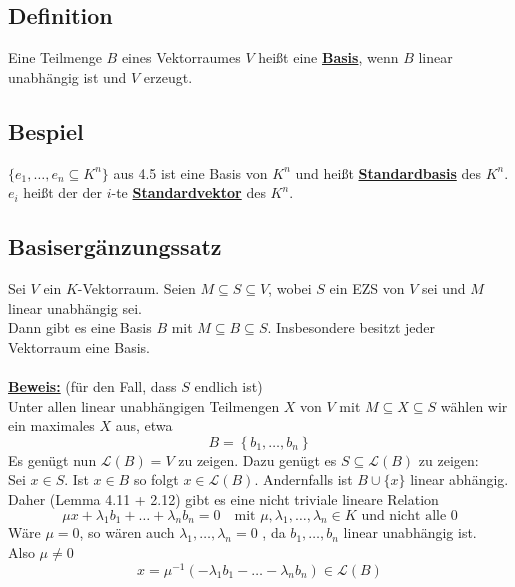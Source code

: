 \subsection{Definition} %
\label{sub:definition}
Eine Teilmenge $B$ eines Vektorraumes $V$ heißt eine \underline{\textbf{Basis}}, wenn $B$ linear unabhängig ist und $V$ erzeugt.

\subsection{Bespiel} %
\label{sub:bespiel}
$\{ e_1, \ldots , e_n \subseteq K^n\}$ aus 4.5 ist eine Basis von $K^n$ und heißt \underline{\textbf{Standardbasis}} des $K^n$. $e_i$ heißt der der $i$-te \underline{\textbf{Standardvektor}} des $K^n$.

\subsection{Basisergänzungssatz} %
\label{sub:basisergänzungssatz}
Sei $V$ ein $K$-Vektorraum. Seien $M \subseteq S \subseteq V$, wobei $S$ ein EZS von $V$ sei und $M$ linear unabhängig sei. \\
Dann gibt es eine Basis $B$ mit $M \subseteq B \subseteq S$. Insbesondere besitzt jeder Vektorraum eine Basis. \\
\vspace{\baselineskip} \\
\underline{\textbf{Beweis:}} (für den Fall, dass $S$ endlich ist) \\
Unter allen linear unabhängigen Teilmengen $X$ von $V$ mit $M \subseteq X \subseteq S$ wählen wir ein maximales $X$ aus, etwa
\[
	B = \left\{ b_1, \ldots , b_n \right\}
\]
Es genügt nun $\mathcal{L}(B) = V$ zu zeigen. Dazu genügt es $S \subseteq \mathcal{L}(B)$ zu zeigen: 
\vspace{\baselineskip} \\
Sei $x \in S$. Ist $x \in B$ so folgt  $x \in \mathcal{L}(B)$. Andernfalls ist $B \cup \{x\}$ linear abhängig. Daher  
(Lemma 4.11 + 2.12) gibt es eine nicht triviale lineare Relation
\[
	\mu x + \lambda_1 b_1 + \ldots + \lambda_n b_n =0 
	\quad \text{mit } \mu, \lambda_1, \ldots , \lambda_n \in K \text{ und nicht alle 0}
\]
Wäre $\mu =0$, so wären auch $\lambda_1, \ldots , \lambda_n = 0$ , da $b_1, \ldots , b_n$ linear unabhängig ist. \\
Also $\mu \not= 0$
\[
	x = \mu^{-1} (- \lambda _1 b_1 - \ldots - \lambda_n b_n) \in \mathcal{L} (B)
\]

